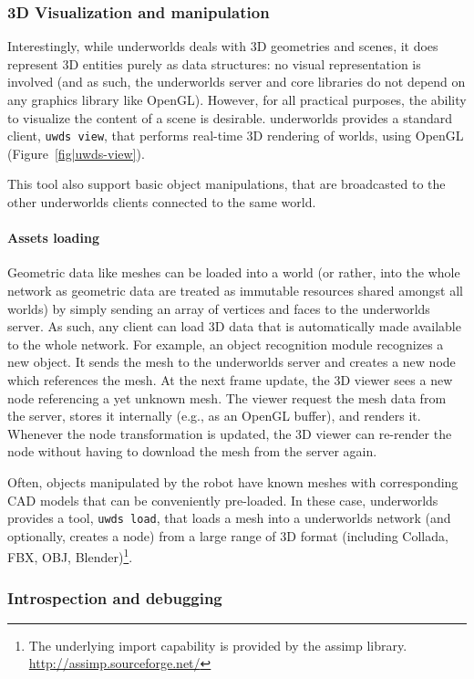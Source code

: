 \documentclass[letterpaper, 10 pt, conference]{ieeeconf}  %
\newcommand{\eg}{e.g.,\xspace}
\newcommand{\uwds}{{\sc underworlds}\xspace}
\begin{document}
\subsubsection{3D Visualization and manipulation}

Interestingly, while \uwds deals with 3D geometries and scenes, it does
represent 3D entities purely as data structures: no visual representation is
involved (and as such, the \uwds server and core libraries do not depend on any
graphics library like OpenGL). However, for all practical purposes, the ability
to visualize the content of a scene is desirable. \uwds provides a standard
client, {\tt uwds view}, that performs real-time 3D rendering of worlds,
using OpenGL (Figure~\ref{fig|uwds-view}).

This tool also support basic object manipulations, that are broadcasted to the
other \uwds clients connected to the same world.

\paragraph*{Assets loading}

Geometric data like meshes can be loaded into a world (or rather, into the whole
network as geometric data are treated as immutable resources shared amongst all
worlds) by simply sending an array of vertices and faces to the \uwds server.
As such, any client can load 3D data that is automatically made available to the
whole network. For example, an object recognition module recognizes a new
object. It sends the mesh to the \uwds server and creates a new node which
references the mesh. At the next frame update, the 3D viewer sees a new node
referencing a yet unknown mesh. The viewer request the mesh data from the
server, stores it internally (\eg as an OpenGL buffer), and renders it. Whenever
the node transformation is updated, the 3D viewer can re-render the node without
having to download the mesh from the server again.

Often, objects manipulated by the robot have known meshes with corresponding CAD
models that can be conveniently pre-loaded. In these case, \uwds provides a
tool, {\tt uwds load}, that loads a mesh into a \uwds network (and optionally,
creates a node) from a large range of 3D format (including Collada, FBX, OBJ,
Blender)\footnote{The underlying import
capability is provided by the {\sc assimp} library.
\url{http://assimp.sourceforge.net/}}.

\subsubsection{Introspection and debugging}
\end{document}
